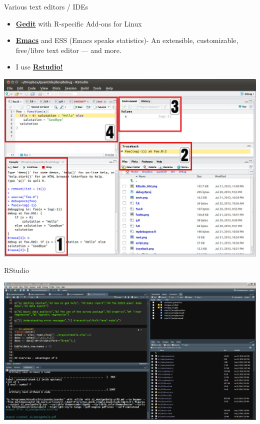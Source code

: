 \documentclass[ignorenonframetext,]{beamer}
\begin{document}
\begin{frame}{Various text editors / IDEs}
\protect\hypertarget{various-text-editors-ides}{}

\begin{itemize}
\item
  \href{https://projects.gnome.org/gedit/}{\textbf{Gedit}} with
  R-specific Add-ons for Linux
\item
  \href{http://www.gnu.org/software/emacs/}{\textbf{Emacs}} and ESS
  (Emacs speaks statistics)- An extensible, customizable, free/libre
  text editor --- and more.
\item
  I use \href{https://www.rstudio.com/}{\textbf{Rstudio!}}
\end{itemize}

\includegraphics{figure/0_overall.jpg}

\end{frame}

\begin{frame}{RStudio}
\protect\hypertarget{rstudio}{}

\includegraphics{figure/RstudioExample.PNG}

\end{frame}
\end{document}
